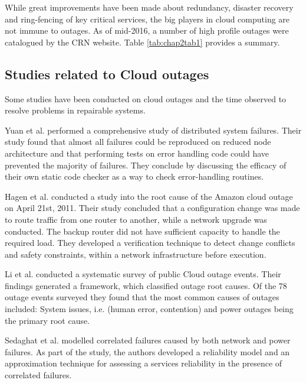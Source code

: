 While great improvements have been made about redundancy, disaster recovery and ring-fencing of key critical services, the big players in cloud computing are not immune to outages. As of mid-2016, a number of high profile outages were catalogued by the CRN website. \cite{CRN2015outage} \cite{CRN2016outage} Table \ref{tab:chap2tab1} provides a summary. \par

\subsection{Studies related to Cloud outages}
Some studies have been conducted on cloud outages and the time observed to resolve problems in repairable systems. \par

Yuan et al. \cite{yuan2014simple} performed a comprehensive study of distributed system failures. Their study found that almost all failures could be reproduced on reduced node architecture and that performing tests on error handling code could have prevented the majority of failures. They conclude by discussing the efficacy of their own static code checker as a way to check error-handling routines. \par

Hagen et al. \cite{hagen2012efficient} conducted a study into the root cause of the Amazon cloud outage on April 21st, 2011. Their study concluded that a configuration change was made to route traffic from one router to another, while a network upgrade was conducted. The backup router did not have sufficient capacity to handle the required load. They developed a verification technique to detect change conflicts and safety constraints, within a network infrastructure before execution. \par

Li et al. \cite{li2013cloud} conducted a systematic survey of public Cloud outage events. Their findings generated a  framework, which classified outage root causes. Of the 78 outage events surveyed they found that the most common causes of outages included: System issues, i.e. (human error, contention) and power outages being the primary root cause. \par

Sedaghat et al. \cite{sedaghat2015hard} modelled correlated failures caused by both network and power failures. As part of the study, the authors developed a reliability model and an approximation technique for assessing a services reliability in the presence of correlated failures. \par 

